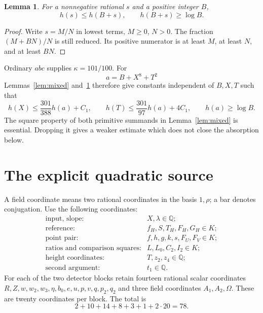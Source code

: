 \documentclass[11pt,a4paper]{article}
\newtheorem{lemma}[theorem]{Lemma}
\theoremstyle{remark}\newtheorem{remark}[theorem]{Remark}
\newcommand{\Q}{\mathbb Q}\newcommand{\Z}{\mathbb Z}
\begin{document}
\begin{lemma}\label{lem:shift}
For a nonnegative rational $s$ and a positive integer $B$,
\[
 h(s)\le h(B+s),\qquad h(B+s)\ge\log B.
\]
\end{lemma}
\begin{proof}
Write $s=M/N$ in lowest terms, $M\ge0$, $N>0$. The fraction
$(M+BN)/N$ is still reduced. Its positive numerator is at least
$M$, at least $N$, and at least $BN$.
\end{proof}

Ordinary $abc$ supplies $\kappa=101/100$. For
\begin{equation}\label{eq:newscale}
 a=B+X^8+T^2
\end{equation}
Lemmas~\ref{lem:mixed} and~\ref{lem:shift} therefore give constants
independent of $B,X,T$ such that
\begin{equation}\label{eq:mixedcoefficients}
 h(X)\le\frac{301}{388}h(a)+C_1,
 \qquad h(T)\le\frac{301}{97}h(a)+4C_1,
 \qquad h(a)\ge\log B.
\end{equation}
The square property of both primitive summands in
Lemma~\ref{lem:mixed} is essential. Dropping it gives a weaker estimate
which does not close the absorption below.

\section{The explicit quadratic source}\label{sec:source}
A field coordinate means two rational coordinates in the basis
$1,\rho$; a bar denotes conjugation. Use the following coordinates:
\[
 \begin{array}{ll}
 \text{input, slope:}&X,\lambda\in\Q;\\
 \text{reference:}& f_H,S,T_H,F_H,G_H\in K;\\
 \text{point pair:}&f,h,g,k,s,F_U,F_V\in K;\\
 \text{ratios and comparison squares:}&L,L_0,C_2,I_2\in K;\\
 \text{height coordinates:}&T,z_2,z_4\in\Q;\\
 \text{second argument:}&t_1\in\Q.
 \end{array}
\]
For each of the two detector blocks retain fourteen rational scalar
coordinates $R,Z,w,w_2,w_3,\eta,b_0,e,u,p,v,q,p_2,q_2$ and three
field coordinates $A_1,A_2,\Omega$. These are twenty coordinates per
block. The total is
\[
 2+10+14+8+3+1+2\cdot20=78.
\]
\end{document}

